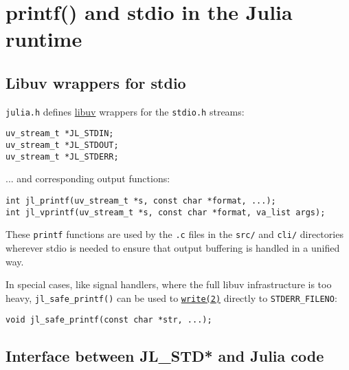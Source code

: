 \hypertarget{12315144918899798229}{}


\section{printf() and stdio in the Julia runtime}



\hypertarget{12808189198177172525}{}


\subsection{Libuv wrappers for stdio}



\texttt{julia.h} defines \href{https://docs.libuv.org}{libuv} wrappers for the \texttt{stdio.h} streams:




\begin{lstlisting}
uv_stream_t *JL_STDIN;
uv_stream_t *JL_STDOUT;
uv_stream_t *JL_STDERR;
\end{lstlisting}



... and corresponding output functions:




\begin{lstlisting}
int jl_printf(uv_stream_t *s, const char *format, ...);
int jl_vprintf(uv_stream_t *s, const char *format, va_list args);
\end{lstlisting}



These \texttt{printf} functions are used by the \texttt{.c} files in the \texttt{src/} and \texttt{cli/} directories wherever stdio is needed to ensure that output buffering is handled in a unified way.



In special cases, like signal handlers, where the full libuv infrastructure is too heavy, \texttt{jl\_safe\_printf()} can be used to \hyperlink{16947913578760238729}{\texttt{write(2)}} directly to \texttt{STDERR\_FILENO}:




\begin{lstlisting}
void jl_safe_printf(const char *str, ...);
\end{lstlisting}



\hypertarget{9919396910097555458}{}


\subsection{Interface between JL\_STD* and Julia code}



